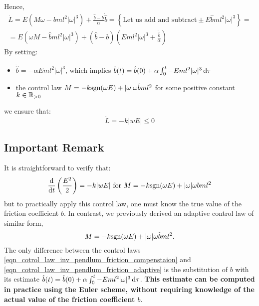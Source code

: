 \documentclass[12pt]{article}
\begin{document}
Hence,
\begin{multline*}
    \dot{L} = E (M\omega - b ml^2 |\omega| ^ 3) +  \frac{\hat{b} - b}{\alpha} \dot{\hat{b}} = 
    \left\{\text{Let us add and subtract} \pm  E\hat{b}ml^2 |\omega| ^ 3\right\} = \\ 
    = E (\omega M - \hat{b} ml^2 |\omega| ^ 3) + \left(\hat{b} - b\right)\left(E ml^2 |\omega| ^ 3 + \frac{\dot{\hat{b}}}{\alpha} \right)
\end{multline*}
By setting:
\begin{itemize}
    \item $\dot{\hat{b}} = - \alpha E m l ^ 2 |\omega| ^ 3$, which implies  $\hat{b}(t) = \hat{b}(0) +  \alpha \int_0^t - E m l ^ 2 |\omega| ^ 3 \mathop{}\!\mathrm{d} \tau $
    \item the control law $M = - k {\text{sgn}}(\omega E) + |\omega|\omega \hat{b} m l ^ 2$  for some positive constant $k \in {\mathbb{R}}_{> 0}$
\end{itemize}
we ensure that:
$$
    \dot{L} = - k |w E| \leq 0
$$
\subsection*{Important Remark}
It is straightforward to verify that:
\begin{equation}
    \label{eqn_cotrol_law_inv_pendlum_friction_compenstaion}
    \frac{\mathop{}\!\mathrm{d} }{\mathop{}\!\mathrm{d} t} \left(\frac{E ^ 2}{2}\right) =  - k |w E| \text{ for }  M = - k {\text{sgn}}(\omega E) + |\omega|\omega b m l ^ 2
\end{equation}
but to practically apply this control law, one must know the true value of the friction coefficient $b$. In contrast, we previously derived an adaptive control law of similar form,
\begin{equation}
    \label{eqn_cotrol_law_inv_pendlum_friction_adaptive}
    M = - k {\text{sgn}}(\omega E) + |\omega|\omega \hat{b} m l ^ 2.
\end{equation}
The only difference between the control laws \eqref{eqn_cotrol_law_inv_pendlum_friction_compenstaion} and \eqref{eqn_cotrol_law_inv_pendlum_friction_adaptive} is the substitution of $b$ with its estimate $\hat{b}(t) =\hat{b}(0) +  \alpha \int_0^t - E m l ^ 2 |\omega| ^ 3 \mathop{}\!\mathrm{d} \tau $. \textbf{This estimate can be computed in practice using the Euler scheme, without requiring knowledge of the actual value of the friction coefficient $b$}.
\end{document}
